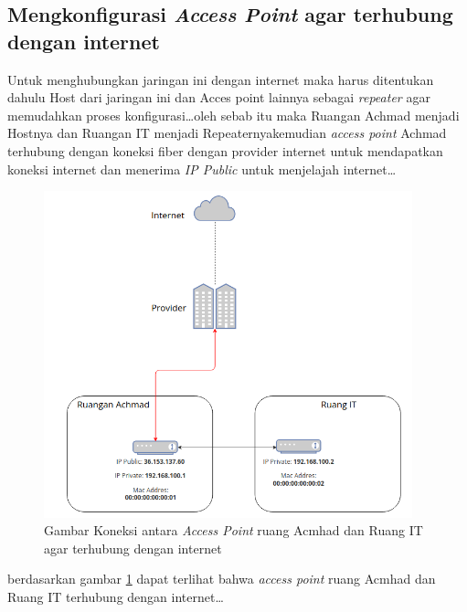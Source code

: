 \documentclass[a4paper, 12pt]{article}
\begin{document}
\subsection{Mengkonfigurasi \textit{Access Point} agar terhubung dengan internet}
Untuk menghubungkan jaringan ini dengan internet maka harus ditentukan dahulu Host dari jaringan ini dan Acces point lainnya sebagai \textit{repeater} agar memudahkan proses konfigurasi\dots oleh sebab itu maka Ruangan Achmad menjadi Hostnya dan Ruangan IT menjadi Repeaternyakemudian \textit{access point} Achmad terhubung dengan koneksi fiber dengan provider internet untuk mendapatkan koneksi internet dan menerima \textit{IP Public} untuk menjelajah internet\dots
\begin{figure}[H]
  \begin{center}
    \includegraphics[width=0.95\textwidth]{images/gambar1.png}
  \end{center}
  \caption{Gambar Koneksi antara \textit{Access Point} ruang Acmhad dan Ruang IT agar terhubung dengan internet}\label{fig:accespoint}
\end{figure}
berdasarkan gambar \ref{fig:accespoint} dapat terlihat bahwa \textit{access point} ruang Acmhad dan Ruang IT terhubung dengan internet\dots
\end{document}

